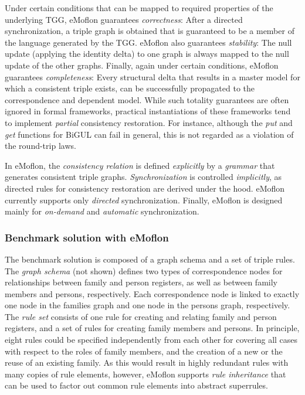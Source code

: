 Under certain conditions that can be mapped to required properties of the underlying TGG, eMoflon guarantees \emph{correctness}: After a directed synchronization, a triple graph is obtained that  is guaranteed to be a member of the language generated by the TGG.
eMoflon also guarantees \emph{stability}: The null update (applying the identity delta) to one graph is always mapped to the null update of the other graphs.
Finally, again under certain conditions, eMoflon guarantees \emph{completeness}: Every structural delta that results in a master model for which a consistent triple exists, can be successfully propagated to the correspondence and dependent model.
While such totality guarantees are often ignored in formal frameworks, practical instantiations of these frameworks tend to implement \emph{partial} consistency restoration.
For instance, although the \emph{put} and \emph{get} functions for BiGUL can fail in general, this is not regarded as a violation of the round-trip laws.

In eMoflon, the \emph{consistency relation} is defined \emph{explicitly} by a \emph{grammar} that generates consistent triple graphs.
\emph{Synchronization} is controlled \emph{implicitly}, as directed rules for consistency restoration are derived under the hood.
eMoflon currently supports only \emph{directed} synchronization.
Finally, eMoflon is designed mainly for \emph{on-demand} and \emph{automatic} synchronization.

\subsubsection{Benchmark solution with eMoflon}
\label{sec:solutionEMoflon}


The benchmark solution is composed of a graph schema and a set of triple rules.
The \emph{graph schema} (not shown) defines two types of correspondence nodes for relationships between family and person registers, as well as between family members and persons, respectively. Each correspondence node is linked to exactly one node in the families graph and one node in the persons graph, respectively.
%
The \emph{rule set} consists of one rule for creating and relating family and person registers, and a set of rules for creating family members and persons.
In principle, eight rules could be specified independently from each other for covering all cases with respect to the roles of family members, and the creation of a new or the reuse of an existing family.
As this would result in highly redundant rules with many copies of rule elements, however, eMoflon supports \emph{rule inheritance} that can be used to factor out common rule elements into abstract superrules. 


